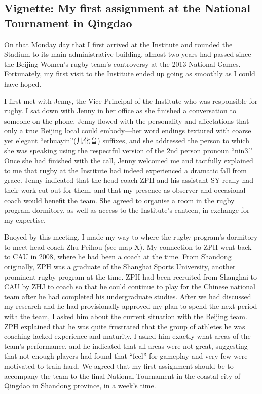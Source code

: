                                             \begin{CJK}{UTF8}{gbsn}

  \section{Vignette: My first assignment at the National Tournament in Qingdao}

  On that Monday day that I first arrived at the Institute and rounded the Stadium to its main administrative building, almost two years had passed since the Beijing Women's rugby team's controversy at the 2013 National Games.  Fortunately, my first visit to the Institute ended up going as smoothly as I could have hoped.

  I first met with Jenny, the Vice-Principal of the Institute who was responsible for rugby.  I sat down with Jenny in her office as she finished a conversation to someone on the phone. Jenny flowed with the personality and affectations that only a true Beijing local could embody---her word endings textured with coarse yet elegant ``erhuayin''(儿化音) suffixes, and she addressed the person to which she was speaking using the respectful version of the 2nd person pronoun ``nin3.''  Once she had finished with the call, Jenny welcomed me and tactfully explained to me that rugby at the Institute had indeed experienced a dramatic fall from grace.  Jenny indicated that the head coach ZPH and his assistant SY really had their work cut out for them, and that my presence as observer and occasional coach would benefit the team.  She agreed to organise a room in the rugby program dormitory, as well as access to the Institute's canteen, in exchange for my expertise.

  Buoyed by this meeting, I made my way to where the rugby program's dormitory to meet head coach Zhu Peihou (see map X).  My connection to ZPH went back to CAU in 2008, where he had been a coach at the time. From Shandong originally, ZPH was a graduate of the Shanghai Sports University, another prominent rugby program at the time.  ZPH had been recruited from Shanghai to CAU by ZHJ to coach so that he could continue to play for the Chinese national team after he had completed his undergraduate studies.  After we had discussed my research and he had provisionally approved my plan to spend the next period with the team, I asked him about the current situation with the Beijing team.  ZPH explained that he was quite frustrated that the group of athletes he was coaching lacked experience and maturity. I asked him exactly what areas of the team's performance, and he indicated that all areas were not great, suggesting that not enough players had found that ``feel'' for gameplay and very few were motivated to train hard.  We agreed that my first assignment should be to accompany the team to the final National Tournament in the coastal city of Qingdao in Shandong province, in a week's time.


\end{CJK}
